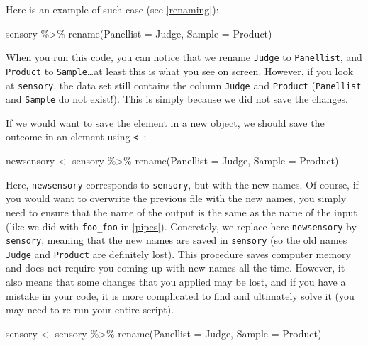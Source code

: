 \documentclass[
]{krantz}
\makeatletter
\newenvironment{Shaded}{\begin{snugshade}}{\end{snugshade}}
\newcommand{\AttributeTok}[1]{\textcolor[rgb]{0.61,0.61,0.61}{#1}}
\newcommand{\FunctionTok}[1]{\textcolor[rgb]{0,0,0}{#1}}
\newcommand{\NormalTok}[1]{#1}
\newcommand{\OtherTok}[1]{\textcolor[rgb]{0.37,0.37,0.37}{#1}}
\newcommand{\SpecialCharTok}[1]{\textcolor[rgb]{0,0,0}{#1}}
\newenvironment{kframe}{%
\medskip{}
\setlength{\fboxsep}{.8em}
 \def\at@end@of@kframe{}%
 \ifinner\ifhmode%
  \def\at@end@of@kframe{\end{minipage}}%
  \begin{minipage}{\columnwidth}%
 \fi\fi%
 \def\FrameCommand##1{\hskip\@totalleftmargin \hskip-\fboxsep
 \colorbox{shadecolor}{##1}\hskip-\fboxsep
     \hskip-\linewidth \hskip-\@totalleftmargin \hskip\columnwidth}%
 \MakeFramed {\advance\hsize-\width
   \@totalleftmargin\z@ \linewidth\hsize
   \@setminipage}}%
 {\par\unskip\endMakeFramed%
 \at@end@of@kframe}
\renewenvironment{Shaded}{\begin{kframe}}{\end{kframe}}
\makeatother
\begin{document}
Here is an example of such case (see \ref{renaming}):

\begin{Shaded}
\begin{Highlighting}[]
\NormalTok{sensory }\SpecialCharTok{\%\textgreater{}\%} 
  \FunctionTok{rename}\NormalTok{(}\AttributeTok{Panellist =}\NormalTok{ Judge, }\AttributeTok{Sample =}\NormalTok{ Product)}
\end{Highlighting}
\end{Shaded}

When you run this code, you can notice that we rename \texttt{Judge} to \texttt{Panellist}, and \texttt{Product} to \texttt{Sample}\ldots at least this is what you see on screen. However, if you look at \texttt{sensory}, the data set still contains the column \texttt{Judge} and \texttt{Product} (\texttt{Panellist} and \texttt{Sample} do not exist!). This is simply because we did not save the changes.

If we would want to save the element in a new object, we should save the outcome in an element using \texttt{\textless{}-}:

\begin{Shaded}
\begin{Highlighting}[]
\NormalTok{newsensory }\OtherTok{\textless{}{-}}\NormalTok{ sensory }\SpecialCharTok{\%\textgreater{}\%} 
  \FunctionTok{rename}\NormalTok{(}\AttributeTok{Panellist =}\NormalTok{ Judge, }\AttributeTok{Sample =}\NormalTok{ Product)}
\end{Highlighting}
\end{Shaded}

Here, \texttt{newsensory} corresponds to \texttt{sensory}, but with the new names. Of course, if you would want to overwrite the previous file with the new names, you simply need to ensure that the name of the output is the same as the name of the input (like we did with \texttt{foo\_foo} in \ref{pipes}). Concretely, we replace here \texttt{newsensory} by \texttt{sensory}, meaning that the new names are saved in \texttt{sensory} (so the old names \texttt{Judge} and \texttt{Product} are definitely lost). This procedure saves computer memory and does not require you coming up with new names all the time. However, it also means that some changes that you applied may be lost, and if you have a mistake in your code, it is more complicated to find and ultimately solve it (you may need to re-run your entire script).

\begin{Shaded}
\begin{Highlighting}[]
\NormalTok{sensory }\OtherTok{\textless{}{-}}\NormalTok{ sensory }\SpecialCharTok{\%\textgreater{}\%} 
  \FunctionTok{rename}\NormalTok{(}\AttributeTok{Panellist =}\NormalTok{ Judge, }\AttributeTok{Sample =}\NormalTok{ Product)}
\end{Highlighting}
\end{Shaded}
\end{document}
